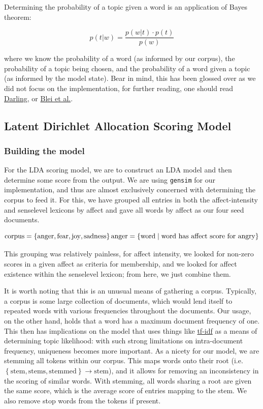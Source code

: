 \documentclass[11pt, twoside, reqno]{book}
\begin{document}
Determining the probability of a topic given a word is an application of Bayes theorem:

$$p(t | w) = \frac{p(w | t)\cdot p(t)}{p(w)}$$

where we know the probability of a word (as informed by our corpus), the probability of a topic being chosen, and the probability of a word given a topic (as informed by the model state). Bear in mind, this has been glossed over as we did not focus on the implementation, for further reading, one should read \href{http://www.ccs.neu.edu/home/vip/teach/DMcourse/5_topicmodel_summ/notes_slides/sampling/darling-lda.pdf}{Darling}, or \href{http://jmlr.csail.mit.edu/papers/v3/blei03a.html}{Blei et al.}.

\subsection{Latent Dirichlet Allocation Scoring Model}

\subsubsection{\textbf{Building the model}}

For the LDA scoring model, we are to construct an LDA model and then determine some score from the output. We are using \texttt{gensim} for our implementation, and thus are almost exclusively concerned with determining the corpus to feed it. For this, we have grouped all entries in both the affect-intensity and senselevel lexicons by affect and gave all words by affect as our four seed documents.

$$\text{corpus} = \left\{\text{anger}, \text{fear}, \text{joy}, \text{sadness}\right\}\\\text{anger} = \left\{\text{word}\mid \text{word has affect score for angry}\right\}$$

This grouping was relatively painless, for affect intensity, we looked for non-zero scores in a given affect as criteria for membership, and we looked for affect existence within the senselevel lexicon; from here, we just combine them.

It is worth noting that this is an unusual means of gathering a corpus. Typically, a corpus is some large collection of documents, which would lend itself to repeated words with various frequencies throughout the documents. Our usage, on the other hand, holds that a word has a maximum document frequency of one. This then has implications on the model that uses things like \href{http://jmlr.csail.mit.edu/papers/v3/blei03a.html}{tf-idf} as a means of determining topic likelihood: with such strong limitations on intra-document frequency, uniqueness becomes more important. As a nicety for our model, we are stemming all tokens within our corpus. This maps words onto their root (i.e. $\left\{ \text{stem}, \text{stems}, \text{stemmed} \right\} \rightarrow \text{stem} $), and it allows for removing an inconsistency in the scoring of similar words. With stemming, all words sharing a root are given the same score, which is the average score of entries mapping to the stem. We also remove stop words from the tokens if present.
\end{document}
